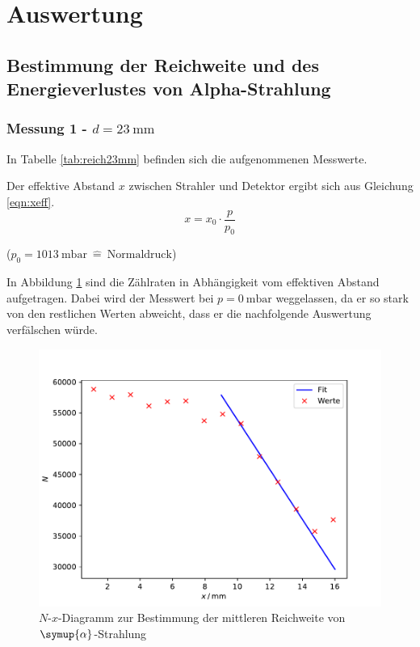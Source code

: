 \section{Auswertung}

\subsection{Bestimmung der Reichweite und des Energieverlustes von Alpha-Strahlung}

\subsubsection{Messung 1 - $d = \SI{23}{\mm}$ \label{sec:23mm}}

In Tabelle \ref{tab:reich23mm} befinden sich die aufgenommenen Messwerte.


Der effektive Abstand $x$ zwischen Strahler und Detektor ergibt sich aus Gleichung \eqref{eqn:xeff}.
\begin{equation}
  x = x_0 \cdot \frac{p}{p_0}
  \label{eqn:xeff}
\end{equation}
\begin{center}
  \tiny{($p_0 = \SI{1013}{\milli \bar} \: \hat{=} \: \text{Normaldruck}$)}
\end{center}

In Abbildung \ref{fig:reich23mm} sind die Zählraten in Abhängigkeit vom effektiven Abstand aufgetragen.
Dabei wird der Messwert bei $p = \SI{0}{\milli \bar}$ weggelassen, da er so stark von den restlichen Werten abweicht, dass er die nachfolgende
Auswertung verfälschen würde.
\begin{figure}[H]
  \centering
  \includegraphics[width=\textwidth]{Plots/reich23mm.pdf}
  \caption{$N$-$x$-Diagramm zur Bestimmung der mittleren Reichweite von $\symup{\alpha}$-Strahlung}
  \label{fig:reich23mm}
\end{figure}

